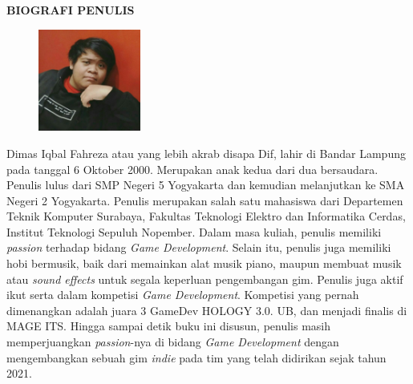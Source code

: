 \begin{center}
  \Large
  \textbf{BIOGRAFI PENULIS}
\end{center}


\vspace{2ex}

\begin{figure}
  \centering
  \vspace{-3ex}
  \includegraphics[width=0.3\textwidth]{gambar/profil.png}
  \vspace{-4ex}
\end{figure}

Dimas Iqbal Fahreza atau yang lebih akrab disapa Dif, lahir di Bandar Lampung pada tanggal 6 Oktober 2000. Merupakan anak kedua dari dua bersaudara. Penulis lulus dari SMP Negeri 5 Yogyakarta dan kemudian melanjutkan ke SMA Negeri 2 Yogyakarta. Penulis merupakan salah satu mahasiswa dari Departemen Teknik Komputer Surabaya, Fakultas Teknologi Elektro dan Informatika Cerdas, Institut Teknologi Sepuluh Nopember. Dalam masa kuliah, penulis memiliki \emph{passion} terhadap bidang \emph{Game Development}. Selain itu, penulis juga memiliki hobi bermusik, baik dari memainkan alat musik piano, maupun membuat musik atau \emph{sound effects} untuk segala keperluan pengembangan gim. Penulis juga aktif ikut serta dalam kompetisi \emph{Game Development}. Kompetisi yang pernah dimenangkan adalah juara 3 GameDev HOLOGY 3.0. UB, dan menjadi finalis di MAGE ITS. Hingga sampai detik buku ini disusun, penulis masih memperjuangkan \emph{passion}-nya di bidang \emph{Game Development} dengan mengembangkan sebuah gim \emph{indie} pada tim yang telah didirikan sejak tahun 2021.
